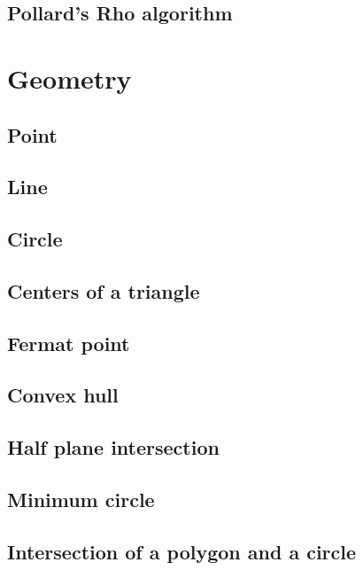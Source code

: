 \documentclass[titlepage, a4paper,10pt]{article}
\begin{document}
\begin{multicols}{2}
\begin{spacing}{0.6}
			\subsection{Pollard's Rho algorithm}
				
		\section{Geometry}
				
			\subsection{Point}
				
			\subsection{Line}
				
			\subsection{Circle}
				
			\subsection{Centers of a triangle}
				
			\subsection{Fermat point}
				
			\subsection{Convex hull}
				
			\subsection{Half plane intersection}
				
			\subsection{Minimum circle}
				
			\subsection{Intersection of a polygon and a circle}
				

\end{spacing}
\end{multicols}
\end{document}
